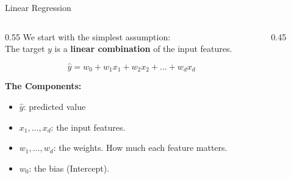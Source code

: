 

\begin{frame}{Linear Regression}
    \begin{columns}[c]
        \begin{column}{0.55\textwidth}
            We start with the simplest assumption: \\
            The target $y$ is a \textbf{linear combination} of the input features.
            
            $$ \hat{y} = w_0 + w_1 x_1 + w_2 x_2 + \dots + w_d x_d $$
            
            \vspace{1em}
            \textbf{The Components:}
            \begin{itemize}
                \item $\hat{y}$: predicted value
                \item $x_1, \dots, x_d$: the input features.
                \item $w_1, \dots, w_d$: the weights. How much each feature matters.
                \item $w_0$: the bias (Intercept). 
                
            \end{itemize}
        \end{column}

       \begin{column}{0.45\textwidth}
            \centering
        \end{column}
    \end{columns}
\end{frame}

